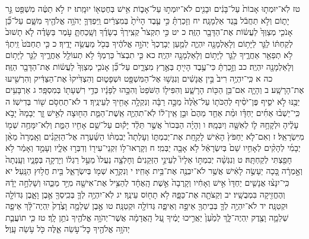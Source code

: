 \documentclass[twoside, openany, parskip=half, 11pt]{book}
\begin{document}
טז לֹֽא־יוּמְת֤וּ אָבוֹת֙ עַל־בָּנִ֔ים וּבָנִ֖ים לֹא־יוּמְת֣וּ עַל־אָב֑וֹת אִ֥ישׁ בְּחֶטְא֖וֹ יוּמָֽתוּ׃
יז לֹ֣א תַטֶּ֔ה מִשְׁפַּ֖ט גֵּ֣ר יָת֑וֹם וְלֹ֣א תַחֲבֹ֔ל בֶּ֖גֶד אַלְמָנָֽה׃ יח וְזָכַרְתָּ֗ כִּ֣י עֶ֤בֶד הָיִ֙יתָ֙ בְּמִצְרַ֔יִם וַֽיִּפְדְּךָ֛ יְהֹוָ֥ה אֱלֹהֶ֖יךָ מִשָּׁ֑ם עַל־כֵּ֞ן אָנֹכִ֤י מְצַוְּךָ֙ לַעֲשׂ֔וֹת אֶת־הַדָּבָ֖ר הַזֶּֽה׃
כ יט כִּ֣י תִקְצֹר֩ קְצִֽירְךָ֨ בְשָׂדֶ֜ךָ וְשָֽׁכַחְתָּ֧ עֹ֣מֶר בַּשָּׂדֶ֗ה לֹ֤א תָשׁוּב֙ לְקַחְתּ֔וֹ לַגֵּ֛ר לַיָּת֥וֹם וְלָאַלְמָנָ֖ה יִהְיֶ֑ה לְמַ֤עַן יְבָרֶכְךָ֙ יְהֹוָ֣ה אֱלֹהֶ֔יךָ בְּכֹ֖ל מַעֲשֵׂ֥ה יָדֶֽיךָ׃
כ כִּ֤י תַחְבֹּט֙ זֵֽיתְךָ֔ לֹ֥א תְפַאֵ֖ר אַחֲרֶ֑יךָ לַגֵּ֛ר לַיָּת֥וֹם וְלָאַלְמָנָ֖ה יִהְיֶֽה׃ כא כִּ֤י תִבְצֹר֙ כַּרְמְךָ֔ לֹ֥א תְעוֹלֵ֖ל אַחֲרֶ֑יךָ לַגֵּ֛ר לַיָּת֥וֹם וְלָאַלְמָנָ֖ה יִהְיֶֽה׃ כב וְזָ֣כַרְתָּ֔ כִּי־עֶ֥בֶד הָיִ֖יתָ בְּאֶ֣רֶץ מִצְרָ֑יִם עַל־כֵּ֞ן אָנֹכִ֤י מְצַוְּךָ֙ לַעֲשׂ֔וֹת אֶת־הַדָּבָ֖ר הַזֶּֽה׃
כה א כִּֽי־יִהְיֶ֥ה רִיב֙ בֵּ֣ין אֲנָשִׁ֔ים וְנִגְּשׁ֥וּ אֶל־הַמִּשְׁפָּ֖ט וּשְׁפָט֑וּם וְהִצְדִּ֙יקוּ֙ אֶת־הַצַּדִּ֔יק וְהִרְשִׁ֖יעוּ אֶת־הָרָשָֽׁע׃ ב וְהָיָ֛ה אִם־בִּ֥ן הַכּ֖וֹת הָרָשָׁ֑ע וְהִפִּיל֤וֹ הַשֹּׁפֵט֙ וְהִכָּ֣הוּ לְפָנָ֔יו כְּדֵ֥י רִשְׁעָת֖וֹ בְּמִסְפָּֽר׃ ג אַרְבָּעִ֥ים יַכֶּ֖נּוּ לֹ֣א יֹסִ֑יף פֶּן־יֹסִ֨יף לְהַכֹּת֤וֹ עַל־אֵ֙לֶּה֙ מַכָּ֣ה רַבָּ֔ה וְנִקְלָ֥ה אָחִ֖יךָ לְעֵינֶֽיךָ׃ ד לֹא־תַחְסֹ֥ם שׁ֖וֹר בְּדִישֽׁוֹ׃
ה כִּֽי־יֵשְׁב֨וּ אַחִ֜ים יַחְדָּ֗ו וּמֵ֨ת אַחַ֤ד מֵהֶם֙ וּבֵ֣ן אֵֽין־ל֔וֹ לֹֽא־תִהְיֶ֧ה אֵֽשֶׁת־הַמֵּ֛ת הַח֖וּצָה לְאִ֣ישׁ זָ֑ר יְבָמָהּ֙ יָבֹ֣א עָלֶ֔יהָ וּלְקָחָ֥הּ ל֛וֹ לְאִשָּׁ֖ה וְיִבְּמָֽהּ׃ ו וְהָיָ֗ה הַבְּכוֹר֙ אֲשֶׁ֣ר תֵּלֵ֔ד יָק֕וּם עַל־שֵׁ֥ם אָחִ֖יו הַמֵּ֑ת וְלֹֽא־יִמָּחֶ֥ה שְׁמ֖וֹ מִיִּשְׂרָאֵֽל׃ ז וְאִם־לֹ֤א יַחְפֹּץ֙ הָאִ֔ישׁ לָקַ֖חַת אֶת־יְבִמְתּ֑וֹ וְעָלְתָה֩ יְבִמְתּ֨וֹ הַשַּׁ֜עְרָה אֶל־הַזְּקֵנִ֗ים וְאָֽמְרָה֙ מֵאֵ֨ן יְבָמִ֜י לְהָקִ֨ים לְאָחִ֥יו שֵׁם֙ בְּיִשְׂרָאֵ֔ל לֹ֥א אָבָ֖ה יַבְּמִֽי׃ ח וְקָֽרְאוּ־ל֥וֹ זִקְנֵי־עִיר֖וֹ וְדִבְּר֣וּ אֵלָ֑יו וְעָמַ֣ד וְאָמַ֔ר לֹ֥א חָפַ֖צְתִּי לְקַחְתָּֽהּ׃ ט וְנִגְּשָׁ֨ה יְבִמְתּ֣וֹ אֵלָיו֮ לְעֵינֵ֣י הַזְּקֵנִים֒ וְחָלְצָ֤ה נַעֲלוֹ֙ מֵעַ֣ל רַגְל֔וֹ וְיָרְקָ֖ה בְּפָנָ֑יו וְעָֽנְתָה֙ וְאָ֣מְרָ֔ה כָּ֚כָה יֵעָשֶׂ֣ה לָאִ֔ישׁ אֲשֶׁ֥ר לֹא־יִבְנֶ֖ה אֶת־בֵּ֥ית אָחִֽיו׃ י וְנִקְרָ֥א שְׁמ֖וֹ בְּיִשְׂרָאֵ֑ל בֵּ֖ית חֲל֥וּץ הַנָּֽעַל׃
יא כִּֽי־יִנָּצ֨וּ אֲנָשִׁ֤ים יַחְדָּו֙ אִ֣ישׁ וְאָחִ֔יו וְקָֽרְבָה֙ אֵ֣שֶׁת הָֽאֶחָ֔ד לְהַצִּ֥יל אֶת־אִישָׁ֖הּ מִיַּ֣ד מַכֵּ֑הוּ וְשָׁלְחָ֣ה יָדָ֔הּ וְהֶחֱזִ֖יקָה בִּמְבֻשָֽׁיו׃ יב וְקַצֹּתָ֖ה אֶת־כַּפָּ֑הּ לֹ֥א תָח֖וֹס עֵינֶֽךָ׃
יג לֹֽא־יִהְיֶ֥ה לְךָ֛ בְּכִֽיסְךָ֖ אֶ֣בֶן וָאָ֑בֶן גְּדוֹלָ֖ה וּקְטַנָּֽה׃ יד לֹא־יִהְיֶ֥ה לְךָ֛ בְּבֵיתְךָ֖ אֵיפָ֣ה וְאֵיפָ֑ה גְּדוֹלָ֖ה וּקְטַנָּֽה׃ טו אֶ֣בֶן שְׁלֵמָ֤ה וָצֶ֙דֶק֙ יִֽהְיֶה־לָּ֔ךְ אֵיפָ֧ה שְׁלֵמָ֛ה וָצֶ֖דֶק יִֽהְיֶה־לָּ֑ךְ לְמַ֙עַן֙ יַאֲרִ֣יכוּ יָמֶ֔יךָ עַ֚ל הָֽאֲדָמָ֔ה אֲשֶׁר־יְהֹוָ֥ה אֱלֹהֶ֖יךָ נֹתֵ֥ן לָֽךְ׃ טז כִּ֧י תוֹעֲבַ֛ת יְהֹוָ֥ה אֱלֹהֶ֖יךָ כׇּל־עֹ֣שֵׂה אֵ֑לֶּה כֹּ֖ל עֹ֥שֵׂה עָֽוֶל׃
\end{document}
